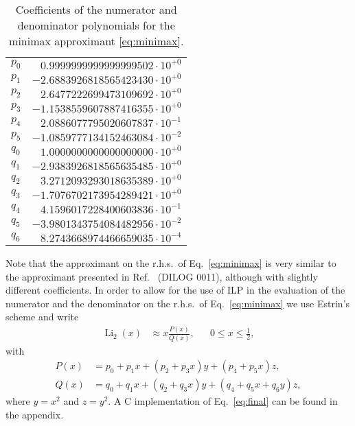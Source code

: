 \documentclass[10pt,DIV16,twocolumn,numbers=noenddot]{scrartcl}
\newcommand{\Li}{\operatorname{Li}_2}
\begin{document}
\begin{table}[t]
  \centering
  \caption{Coefficients of the numerator and denominator polynomials
    for the minimax approximant \eqref{eq:minimax}.}
  \begin{tabular}{lr}
    \toprule
    $p_0$ & $ 0.9999999999999999502\cdot 10^{+0}$ \\
    $p_1$ & $-2.6883926818565423430\cdot 10^{+0}$ \\
    $p_2$ & $ 2.6477222699473109692\cdot 10^{+0}$ \\
    $p_3$ & $-1.1538559607887416355\cdot 10^{+0}$ \\
    $p_4$ & $ 2.0886077795020607837\cdot 10^{-1}$ \\
    $p_5$ & $-1.0859777134152463084\cdot 10^{-2}$ \\
    $q_0$ & $ 1.0000000000000000000\cdot 10^{+0}$ \\
    $q_1$ & $-2.9383926818565635485\cdot 10^{+0}$ \\
    $q_2$ & $ 3.2712093293018635389\cdot 10^{+0}$ \\
    $q_3$ & $-1.7076702173954289421\cdot 10^{+0}$ \\
    $q_4$ & $ 4.1596017228400603836\cdot 10^{-1}$ \\
    $q_5$ & $-3.9801343754084482956\cdot 10^{-2}$ \\
    $q_6$ & $ 8.2743668974466659035\cdot 10^{-4}$ \\
    \bottomrule
  \end{tabular}
  \label{tab:coeffs}
\end{table}
%
Note that the approximant on the r.h.s.\ of Eq.~\eqref{eq:minimax} is
very similar to the approximant presented in Ref.~\cite{morris} (DILOG
0011), although with slightly different coefficients.  In order to
allow for the use of ILP in the evaluation of the numerator and the
denominator on the r.h.s.\ of Eq.~\eqref{eq:minimax} we use Estrin's
scheme and write
%
\begin{align}
  \Li(x) &\approx x\frac{P(x)}{Q(x)}, & &0\leq x \leq \frac{1}{2},
  \label{eq:final}
\end{align}
%
with
%
\begin{align}
  P(x) &= p_0 + p_1 x + (p_2 + p_3 x) y + (p_4 + p_5 x) z, \\
  Q(x) &= q_0 + q_1 x + (q_2 + q_3 x) y + (q_4 + q_5 x + q_6 y) z,
\end{align}
%
where $y=x^2$ and $z=y^2$.  A C implementation of Eq.~\eqref{eq:final}
can be found in the appendix.
\end{document}
